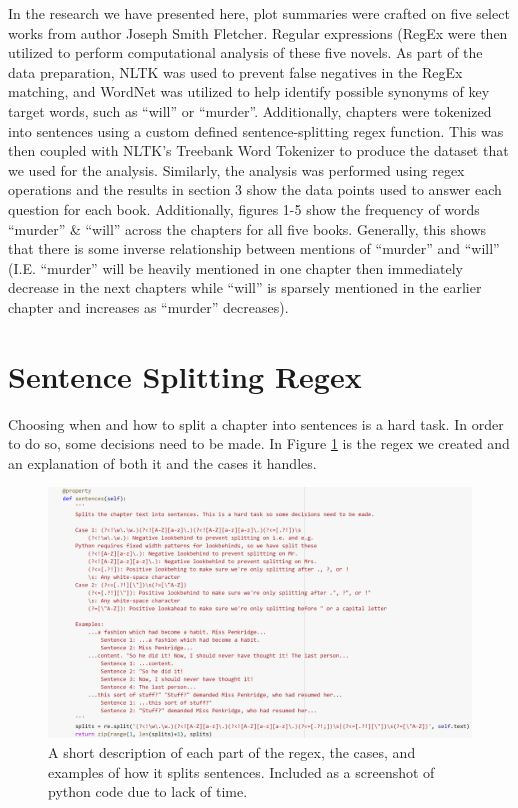 \documentclass{article}
\begin{document}
In the research we have presented here, plot summaries were crafted on five select works from author Joseph Smith Fletcher. Regular expressions (RegEx were then utilized to perform computational analysis of these five novels. As part of the data preparation, NLTK was used to prevent false negatives in the RegEx matching, and WordNet was utilized to help identify possible synonyms of key target words, such as ``will'' or ``murder''. Additionally, chapters were tokenized into sentences using a custom defined sentence-splitting regex function. This was then coupled with NLTK’s Treebank Word Tokenizer to produce the dataset that we used for the analysis. Similarly, the analysis was performed using regex operations and the results in section 3 show the data points used to answer each question for each book. Additionally, figures 1-5 show the frequency of words ``murder'' \& ``will'' across the chapters for all five books. Generally, this shows that there is some inverse relationship between mentions of “murder” and “will” (I.E. ``murder'' will be heavily mentioned in one chapter then immediately decrease in the next chapters while ``will'' is sparsely mentioned in the earlier chapter and increases as ``murder'' decreases).

{}


\appendix

\section{Sentence Splitting Regex} \label{sect:regex}

Choosing when and how to split a chapter into sentences is a hard task. In order to do so, some decisions need to be made. In Figure \ref{fig:sentence-regex} is the regex we created and an explanation of both it and the cases it handles.

\begin{figure}[htbp]
  \centering
  \includegraphics[width=\linewidth]{regex.PNG}
  \caption{A short description of each part of the regex, the cases, and examples of how it splits sentences. Included as a screenshot of python code due to lack of time.}
  \label{fig:sentence-regex}
\end{figure}
\end{document}
